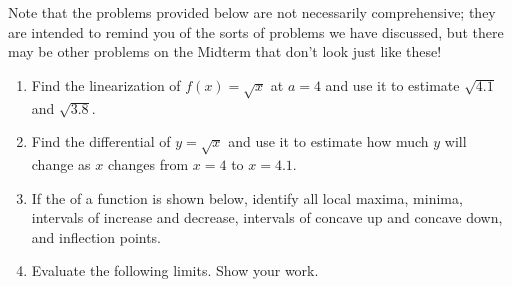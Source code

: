 \documentclass[11pt,fleqn]{article}
\newcommand{\be}{\begin{enumerate}}
\newcommand{\ee}{\end{enumerate}}
\renewcommand{\d}{\displaystyle}
\begin{document}
Note that the problems provided below are not necessarily comprehensive; they are intended to remind you of the sorts of problems we have discussed, but there may be other problems on the Midterm that don't look just like these!
\newpage
\begin{enumerate}
\item Find the linearization of $f(x)=\sqrt{x}$ at $a=4$ and use it to estimate $\sqrt{4.1}$ and $\sqrt{3.8}$.
\vfill
\item Find the differential of $y=\sqrt{x}$ and use it to estimate how much $y$ will change as $x$ changes from $x=4$ to $x=4.1.$
\vfill

\item If the  of a function is shown below, identify all local maxima, minima, intervals of increase and decrease, intervals of concave up and concave down, and inflection points.


\item Evaluate the following limits. Show your work. 
\be
{}
\vspace{2.5in}
\ee
\newpage


\end{enumerate}
\end{document}

